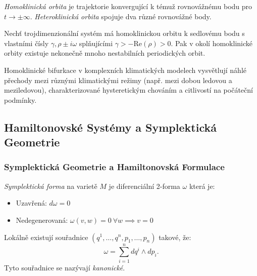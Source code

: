\begin{definition}
\emph{Homoklinická orbita} je trajektorie konvergující k témuž rovnovážnému bodu pro $t \to \pm\infty$. \emph{Heteroklinická orbita} spojuje dva různé rovnovážné body.
\end{definition}

\begin{theorem}
Nechť trojdimenzionální systém má homoklinickou orbitu k sedlovému bodu s vlastními čísly $\gamma, \rho \pm i\omega$ splňujícími $\gamma > -\mathrm{Re}(\rho) > 0$. Pak v okolí homoklinické orbity existuje nekonečně mnoho nestabilních periodických orbit.
\end{theorem}

\begin{application}
Homoklinické bifurkace v komplexních klimatických modelech vysvětlují náhlé přechody mezi různými klimatickými režimy (např. mezi dobou ledovou a meziledovou), charakterizované hysteretickým chováním a citlivostí na počáteční podmínky.
\end{application}

\spc

\subsection{Hamiltonovské Systémy a Symplektická Geometrie}

\subsubsection{Symplektická Geometrie a Hamiltonovská Formulace}

\begin{definition}
\emph{Symplektická forma} na varietě $M$ je diferenciální 2-forma $\omega$ která je:
\begin{itemize}
\item Uzavřená: $d\omega = 0$
\item Nedegenerovaná: $\omega(v, w) = 0\ \forall w \implies v = 0$
\end{itemize}
\end{definition}

\begin{theorem}
Lokálně existují souřadnice $(q^1, \dots, q^n, p_1, \dots, p_n)$ takové, že:
\[
\omega = \sum_{i=1}^n dq^i \wedge dp_i.
\]
Tyto souřadnice se nazývají \emph{kanonické}.
\end{theorem}

